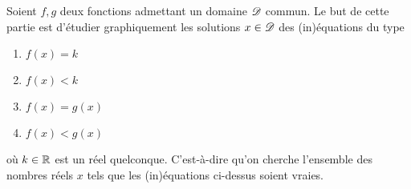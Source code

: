 	Soient $f, g$ deux fonctions admettant un domaine $\mathcal{D}$ commun.
	Le but de cette partie est d'étudier graphiquement les solutions $x\in\mathcal{D}$ des (in)équations du type
		\begin{multicols}{2}
		\begin{enumerate}[label=$\bullet$]
			\item $f(x) = k$
			\item $f(x) < k$
			\item $f(x) = g(x)$
			\item $f(x) < g(x)$
		\end{enumerate}
		\end{multicols}
	\noindent où $k\in\mathbb{R}$ est un réel quelconque.
	C'est-à-dire qu'on cherche l'ensemble des nombres réels $x$ tels que les (in)équations ci-dessus soient vraies.